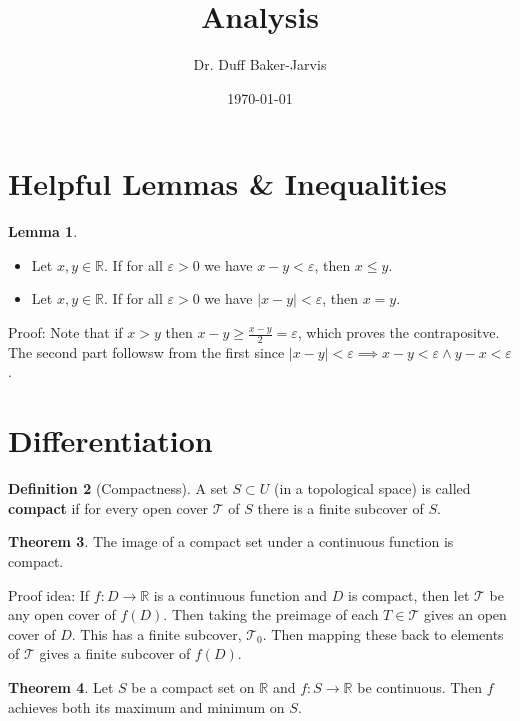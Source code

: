 \documentclass[12pt]{article}
\theoremstyle{definition}
\newtheorem{thm}{Theorem}
\newtheorem{lem}[thm]{Lemma}
\newtheorem{defn}[thm]{Definition}
\def\R{{\mathbb R}}
\begin{document}
\title{Analysis}
\date{\today}
\author{Dr. Duff Baker-Jarvis}
\maketitle

\section{Helpful Lemmas \& Inequalities}
\begin{lem}
\begin{itemize}
    \item Let $ x,y\in \R $. If for all $ \varepsilon>0 $ we have $ x-y<\varepsilon $, then $x\leq y$.
    \item Let $x,y \in \R$. If for all $ \varepsilon>0 $  we have $ |x-y|<\varepsilon $, then $ x=y $.
\end{itemize}
\end{lem}

Proof: Note that if $ x>y $ then $ x-y\geq \frac{x-y}{2}=\varepsilon $, which proves the contrapositve.
The second part followsw from the first since $ |x-y|<\varepsilon \implies x-y<\varepsilon \land y-x <\varepsilon$.


\section{Differentiation}

\begin{defn}[Compactness]
    A set $S\subset U$ (in a topological space) is called \textbf{compact} if for every open cover $ \mathcal{T} $ of $ S $ there is a finite subcover of $ S $. 
\end{defn}


\begin{thm}\label{thm-continuous_compact}
The image of a compact set under a continuous function is compact.
\end{thm}
Proof idea: If $ f:D\to \R $ is a continuous function and $ D $ is compact, then let $ \mathcal{T} $ be any open cover of $ f(D) $. Then taking the preimage of each $ T\in \mathcal{T} $ gives an open cover of $D$. This has a finite subcover, $ \mathcal{T}_0 $. Then mapping these back to elements of $ \mathcal{T} $ gives a finite subcover of $ f(D) $.

\begin{thm}
Let $ S $ be a compact set on $ \R $ and $ f:S\to \R $ be continuous. Then $ f $ achieves both its maximum and minimum on $ S $. 
\end{thm}
\end{document}
